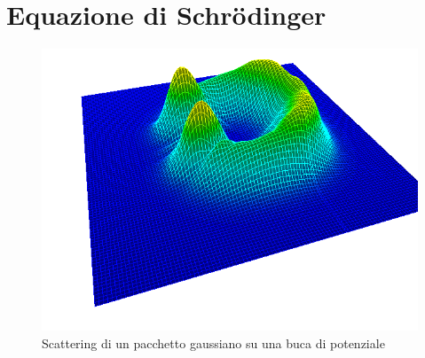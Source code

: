 \documentclass[a4paper,11pt]{report}
\begin{document}
\section{Equazione di Schr\"{o}dinger}
\begin{figure}[h]
\centering
\includegraphics[width=\textwidth]{schrodinger}
\caption{Scattering di un pacchetto gaussiano su una buca di potenziale}
\label{fig:schrodinger}
\end{figure}
\end{document}
